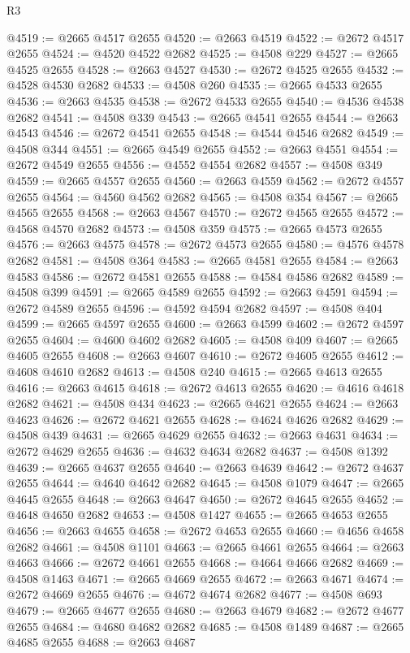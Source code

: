 \begin{lexlean}{R3}
\begin{coremodule}
@4519 := @2665 @4517 @2655
@4520 := @2663 @4519
@4522 := @2672 @4517 @2655
@4524 := @4520 @4522 @2682
@4525 := @4508 @229
@4527 := @2665 @4525 @2655
@4528 := @2663 @4527
@4530 := @2672 @4525 @2655
@4532 := @4528 @4530 @2682
@4533 := @4508 @260
@4535 := @2665 @4533 @2655
@4536 := @2663 @4535
@4538 := @2672 @4533 @2655
@4540 := @4536 @4538 @2682
@4541 := @4508 @339
@4543 := @2665 @4541 @2655
@4544 := @2663 @4543
@4546 := @2672 @4541 @2655
@4548 := @4544 @4546 @2682
@4549 := @4508 @344
@4551 := @2665 @4549 @2655
@4552 := @2663 @4551
@4554 := @2672 @4549 @2655
@4556 := @4552 @4554 @2682
@4557 := @4508 @349
@4559 := @2665 @4557 @2655
@4560 := @2663 @4559
@4562 := @2672 @4557 @2655
@4564 := @4560 @4562 @2682
@4565 := @4508 @354
@4567 := @2665 @4565 @2655
@4568 := @2663 @4567
@4570 := @2672 @4565 @2655
@4572 := @4568 @4570 @2682
@4573 := @4508 @359
@4575 := @2665 @4573 @2655
@4576 := @2663 @4575
@4578 := @2672 @4573 @2655
@4580 := @4576 @4578 @2682
@4581 := @4508 @364
@4583 := @2665 @4581 @2655
@4584 := @2663 @4583
@4586 := @2672 @4581 @2655
@4588 := @4584 @4586 @2682
@4589 := @4508 @399
@4591 := @2665 @4589 @2655
@4592 := @2663 @4591
@4594 := @2672 @4589 @2655
@4596 := @4592 @4594 @2682
@4597 := @4508 @404
@4599 := @2665 @4597 @2655
@4600 := @2663 @4599
@4602 := @2672 @4597 @2655
@4604 := @4600 @4602 @2682
@4605 := @4508 @409
@4607 := @2665 @4605 @2655
@4608 := @2663 @4607
@4610 := @2672 @4605 @2655
@4612 := @4608 @4610 @2682
@4613 := @4508 @240
@4615 := @2665 @4613 @2655
@4616 := @2663 @4615
@4618 := @2672 @4613 @2655
@4620 := @4616 @4618 @2682
@4621 := @4508 @434
@4623 := @2665 @4621 @2655
@4624 := @2663 @4623
@4626 := @2672 @4621 @2655
@4628 := @4624 @4626 @2682
@4629 := @4508 @439
@4631 := @2665 @4629 @2655
@4632 := @2663 @4631
@4634 := @2672 @4629 @2655
@4636 := @4632 @4634 @2682
@4637 := @4508 @1392
@4639 := @2665 @4637 @2655
@4640 := @2663 @4639
@4642 := @2672 @4637 @2655
@4644 := @4640 @4642 @2682
@4645 := @4508 @1079
@4647 := @2665 @4645 @2655
@4648 := @2663 @4647
@4650 := @2672 @4645 @2655
@4652 := @4648 @4650 @2682
@4653 := @4508 @1427
@4655 := @2665 @4653 @2655
@4656 := @2663 @4655
@4658 := @2672 @4653 @2655
@4660 := @4656 @4658 @2682
@4661 := @4508 @1101
@4663 := @2665 @4661 @2655
@4664 := @2663 @4663
@4666 := @2672 @4661 @2655
@4668 := @4664 @4666 @2682
@4669 := @4508 @1463
@4671 := @2665 @4669 @2655
@4672 := @2663 @4671
@4674 := @2672 @4669 @2655
@4676 := @4672 @4674 @2682
@4677 := @4508 @693
@4679 := @2665 @4677 @2655
@4680 := @2663 @4679
@4682 := @2672 @4677 @2655
@4684 := @4680 @4682 @2682
@4685 := @4508 @1489
@4687 := @2665 @4685 @2655
@4688 := @2663 @4687

\end{coremodule}
\end{lexlean}
